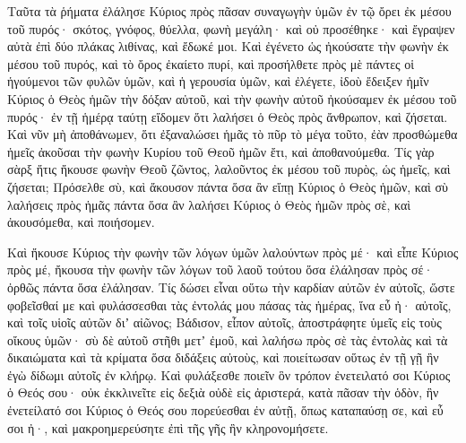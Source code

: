 {\par }{\PP {}Ταῦτα τὰ ῥήματα ἐλάλησε Κύριος πρὸς πᾶσαν συναγωγὴν ὑμῶν ἐν τῷ ὄρει ἐκ μέσου τοῦ πυρός· σκότος, γνόφος, θύελλα, φωνὴ μεγάλη· καὶ οὐ προσέθηκε· καὶ ἔγραψεν αὐτὰ ἐπὶ δύο πλάκας λιθίνας, καὶ ἔδωκέ μοι.
Καὶ ἐγένετο ὡς ἠκούσατε τὴν φωνὴν ἐκ μέσου τοῦ πυρός, καὶ τὸ ὄρος ἐκαίετο πυρί, καὶ προσήλθετε πρὸς μὲ πάντες οἱ ἡγούμενοι τῶν φυλῶν ὑμῶν, καὶ ἡ γερουσία ὑμῶν,
καὶ ἐλέγετε, ἰδοὺ ἔδειξεν ἡμῖν Κύριος ὁ Θεὸς ἡμῶν τὴν δόξαν αὐτοῦ, καὶ τὴν φωνὴν αὐτοῦ ἠκούσαμεν ἐκ μέσου τοῦ πυρός· ἐν τῇ ἡμέρᾳ ταύτῃ εἴδομεν ὅτι λαλήσει ὁ Θεὸς πρὸς ἄνθρωπον, καὶ ζήσεται.
Καὶ νῦν μὴ ἀποθάνωμεν, ὅτι ἐξαναλώσει ἡμᾶς τὸ πῦρ τὸ μέγα τοῦτο, ἐὰν προσθώμεθα ἡμεῖς ἀκοῦσαι τὴν φωνὴν Κυρίου τοῦ Θεοῦ ἡμῶν ἔτι, καὶ ἀποθανούμεθα.
Τίς γὰρ σὰρξ ἥτις ἤκουσε φωνὴν Θεοῦ ζῶντος, λαλοῦντος ἐκ μέσου τοῦ πυρὸς, ὡς ἡμεῖς, καὶ ζήσεται;
Πρόσελθε σὺ, καὶ ἄκουσον πάντα ὅσα ἂν εἴπῃ Κύριος ὁ Θεὸς ἡμῶν, καὶ σὺ λαλήσεις πρὸς ἡμᾶς πάντα ὅσα ἂν λαλήσει Κύριος ὁ Θεὸς ἡμῶν πρὸς σὲ, καὶ ἀκουσόμεθα, καὶ ποιήσομεν.
\par }{\PP {}Καὶ ἤκουσε Κύριος τὴν φωνὴν τῶν λόγων ὑμῶν λαλούντων πρὸς μέ· καὶ εἶπε Κύριος πρὸς μέ, ἤκουσα τὴν φωνὴν τῶν λόγων τοῦ λαοῦ τούτου ὅσα ἐλάλησαν πρὸς σέ· ὀρθῶς πάντα ὅσα ἐλάλησαν.
Τίς δώσει εἶναι οὕτω τὴν καρδίαν αὐτῶν ἐν αὐτοῖς, ὥστε φοβεῖσθαί με καὶ φυλάσσεσθαι τὰς ἐντολάς μου πάσας τὰς ἡμέρας, ἵνα εὖ ἠ· αὐτοῖς, καὶ τοῖς υἱοῖς αὐτῶν διʼ αἰῶνος;
Βάδισον, εἶπον αὐτοῖς, ἀποστράφητε ὑμεῖς εἰς τοὺς οἴκους ὑμῶν·
σὺ δὲ αὐτοῦ στῆθι μετʼ ἐμοῦ, καὶ λαλήσω πρὸς σὲ τὰς ἐντολὰς καὶ τὰ δικαιώματα καὶ τὰ κρίματα ὅσα διδάξεις αὐτοὺς, καὶ ποιείτωσαν οὕτως ἐν τῇ γῇ ἣν ἐγὼ δίδωμι αὐτοῖς ἐν κλήρῳ.
Καὶ φυλάξεσθε ποιεῖν ὃν τρόπον ἐνετειλατό σοι Κύριος ὁ Θεός σου· οὐκ ἐκκλινεῖτε εἰς δεξιὰ οὐδὲ εἰς ἀριστερά,
κατὰ πᾶσαν τὴν ὁδὸν, ἣν ἐνετείλατό σοι Κύριος ὁ Θεός σου πορεύεσθαι ἐν αὐτῇ, ὅπως καταπαύσῃ σε, καὶ εὖ σοι ἠ·, καὶ μακροημερεύσητε ἐπὶ τῆς γῆς ἣν κληρονομήσετε.

}
